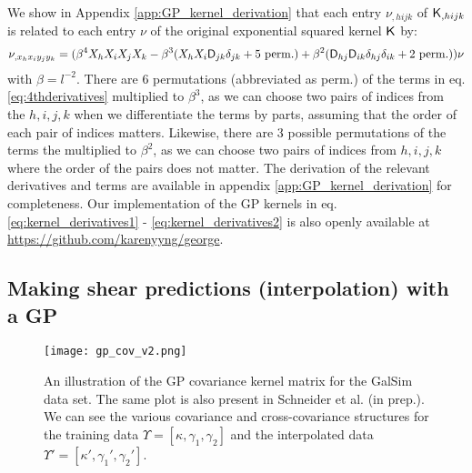 We show in Appendix \ref{app:GP_kernel_derivation} 
that each entry $\nu_{,hijk}$ of $\mathsf{K}_{,hijk}$ is
related to each entry $\nu$ of the original exponential squared kernel
$\mathsf{K}$ by:
\begin{equation}
\nu_{,x_h x_i y_j y_k} = (\beta^4 X_h X_i X_j X_k -
\beta^3 (X_h X_i \mathsf{D}_{jk} \delta_{jk} + 5~{\rm perm.}) + \beta^2
(\mathsf{D}_{hj} \mathsf{D}_{ik}\delta_{hj}\delta_{ik} + 2~{\rm perm.})) \nu
\label{eq:4thderivatives}
\end{equation}
with $\beta = l^{-2}$. There are 6 permutations (abbreviated as perm.) of the terms in
eq. \ref{eq:4thderivatives}
multiplied to $\beta^3$, as we can choose two pairs of indices from the $h,i,j,k$ 
when we differentiate the terms by parts, assuming that the order of each
pair of indices matters. 
Likewise, there are 3 possible permutations of
the terms the multiplied to $\beta^2$, as we can choose two pairs of indices from
$h, i, j, k$ where the order of the pairs does not matter.
The derivation of the relevant derivatives and terms are available 
in appendix \ref{app:GP_kernel_derivation} for completeness. 
Our implementation of the GP kernels in eq. \ref{eq:kernel_derivatives1} - 
\ref{eq:kernel_derivatives2} is also openly available at
\href{https://github.com/karenyyng/george}{https://github.com/karenyyng/george}.


\subsection{Making shear predictions (interpolation) with a GP}


\begin{figure}
	\centering
	\texttt{[image: gp\_cov\_v2.png]}
	\caption{An illustration of the GP covariance kernel matrix for the {\sc GalSim} data set.
		The same plot is also present in Schneider et al. (in prep.). We can see the various covariance
		and cross-covariance
		structures for the training data $\Upsilon = [\kappa, \gamma_1, \gamma_2]$
		and the interpolated data $\Upsilon' = [\kappa', \gamma_1', \gamma_2']$.
		\label{fig:GP_kernel_vis}}
\end{figure}

